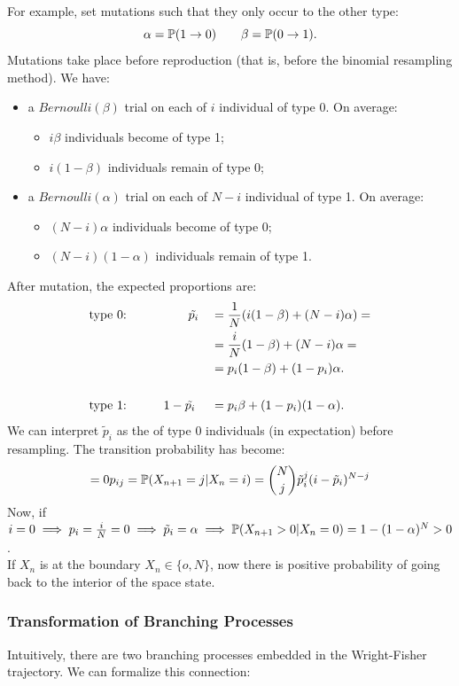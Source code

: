 \documentclass{article}
\begin{document}
For example, set mutations such that they only occur to the other type:
\[
\alpha=\mathbb{P}(1\rightarrow0)\qquad\beta=\mathbb{P}(0\rightarrow1).
\]
Mutations take place before reproduction (that is, before the binomial resampling method). We have:
\begin{itemize}
    \item a $Bernoulli(\beta)$ trial on each of $i$ individual of type 0. On average:
    \begin{itemize}
        \item $i\beta$ individuals become of type 1;
        \item $i(1-\beta)$ individuals remain of type 0;
    \end{itemize}
    \item a $Bernoulli(\alpha)$ trial on each of $N-i$ individual of type 1. On average:
    \begin{itemize}
        \item $(N-i)\alpha$ individuals become of type 0;
        \item $(N-i)(1-\alpha)$ individuals remain of type 1.
    \end{itemize}
\end{itemize}
After mutation, the expected proportions are:
\begin{alignat*}{3}
    &\text{type 0:}&&\qquad \Tilde{p_i}&&=\frac{1}{N}(i(1-\beta)+(N-i)\alpha)=\\
    & && &&=\frac{i}{N}(1-\beta)+(N-i)\alpha=\\
    & && &&=p_i(1-\beta)+(1-p_i)\alpha.\\
    \\
    &\text{type 1:}\qquad &&1-\tilde{p_i}&&=p_i\beta+(1-p_i)(1-\alpha).
\end{alignat*}
We can interpret $\tilde{p}_i$ as the  of type 0 individuals (in expectation) before resampling. The transition probability has become:
\[=0
p_{ij}=\mathbb{P}(X_{n+1}=j|X_n=i)=\binom{N}{j}\Tilde{p}_i^j(i-\Tilde{p}_i)^{N-j}
\]
Now, if $i=0\implies p_i=\frac{i}{N}=0\implies\Tilde{p}_i=\alpha\implies\mathbb{P}(X_{n+1}>0|X_n=0)=1-(1-\alpha)^N>0$.\\
If $X_n$ is at the boundary $X_n \in \{o,N\}$, now there is positive probability of going back to the interior of the space state.
\subsubsection*{Transformation of Branching Processes}
Intuitively, there are two branching processes embedded in the Wright-Fisher trajectory. We can formalize this connection:
\end{document}
